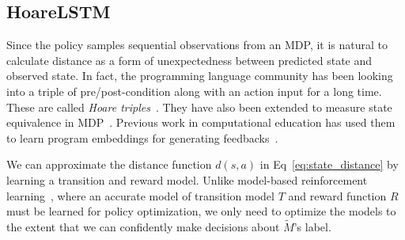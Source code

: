 \documentclass{article}
\begin{document}
\subsection{HoareLSTM} 
\label{sec:hoarelstm}
\vspace{-2mm} 


Since the policy samples sequential observations from an MDP, it is natural to calculate distance as a form of unexpectedness between predicted state and observed state. In fact, the programming language community has been looking into a triple of pre/post-condition along with an action input for a long time. These are called \textit{Hoare triples}~\cite{hoare1969axiomatic}. They have also been extended to measure state equivalence in MDP~\cite{castro2009equivalence}. Previous work in computational education has used them to learn program embeddings for generating feedbacks~\cite{piech2015learning}.

We can approximate the distance function $d(s, a)$ in Eq~\ref{eq:state_distance} by learning a transition and reward model. 
Unlike model-based reinforcement learning~\cite{kaelbling1996reinforcement}, where an accurate model of transition model $T$ and reward function $R$ must be learned for policy optimization, we only need to optimize the models to the extent that we can confidently make decisions about $\tilde M$'s label. 
\end{document}
